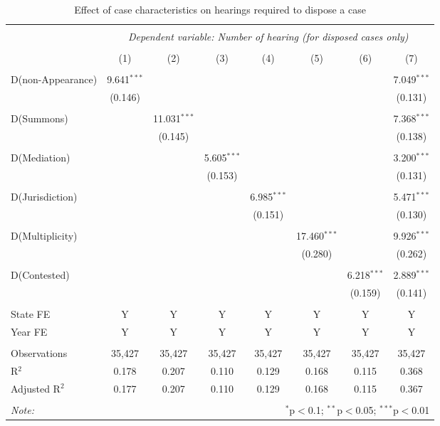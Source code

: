 \begin{table}[!ht]
  \caption{Effect of case characteristics on hearings required to dispose a case}\label{tab:hearings_regression}
  \footnotesize \hspace{-0.5cm}
  \begin{tabular}{lccccccc}
    \\[-1.8ex]
    \hline \\[-1.8ex] 
    & \multicolumn{7}{c}{\textit{Dependent variable: Number of hearing (for disposed cases only)}} \\ 
    \cline{2-8} 
    \\[-1.8ex] & (1) & (2) & (3) & (4) & (5) & (6) & (7)\\ 
    \hline \\[-1.8ex]
    D(non-Appearance) & 9.641$^{***}$ &  &  &  &  &  & 7.049$^{***}$ \\ 
    & (0.146) &  &  &  &  &  & (0.131) \\ 
    & & & & & & & \\ 
    D(Summons) &  & 11.031$^{***}$ &  &  &  &  & 7.368$^{***}$ \\ 
    &  & (0.145) &  &  &  &  & (0.138) \\ 
    & & & & & & & \\ 
    D(Mediation) &  &  & 5.605$^{***}$ &  &  &  & 3.200$^{***}$ \\ 
    &  &  & (0.153) &  &  &  & (0.131) \\ 
    & & & & & & & \\ 
    D(Jurisdiction) &  &  &  & 6.985$^{***}$ &  &  & 5.471$^{***}$ \\ 
    &  &  &  & (0.151) &  &  & (0.130) \\ 
    & & & & & & & \\ 
    D(Multiplicity) &  &  &  &  & 17.460$^{***}$ &  & 9.926$^{***}$ \\ 
    &  &  &  &  & (0.280) &  & (0.262) \\ 
    & & & & & & & \\ 
    D(Contested) &  &  &  &  &  & 6.218$^{***}$ & 2.889$^{***}$ \\ 
    &  &  &  &  &  & (0.159) & (0.141) \\ 
    \hline \\[-1.8ex]
    State FE & Y & Y & Y & Y & Y & Y & Y \\ 
    Year FE & Y & Y & Y & Y & Y & Y & Y \\ 
    \hline \\[-1.8ex] 
    Observations & 35,427 & 35,427 & 35,427 & 35,427 & 35,427 & 35,427 & 35,427 \\ 
    R$^{2}$ & 0.178 & 0.207 & 0.110 & 0.129 & 0.168 & 0.115 & 0.368 \\ 
    Adjusted R$^{2}$ & 0.177 & 0.207 & 0.110 & 0.129 & 0.168 & 0.115 & 0.367 \\ 
    \hline \\[-1.8ex] 
    \textit{Note:}  & \multicolumn{7}{r}{$^{*}$p$<$0.1; $^{**}$p$<$0.05; $^{***}$p$<$0.01} \\ 
  \end{tabular} 
\end{table}

